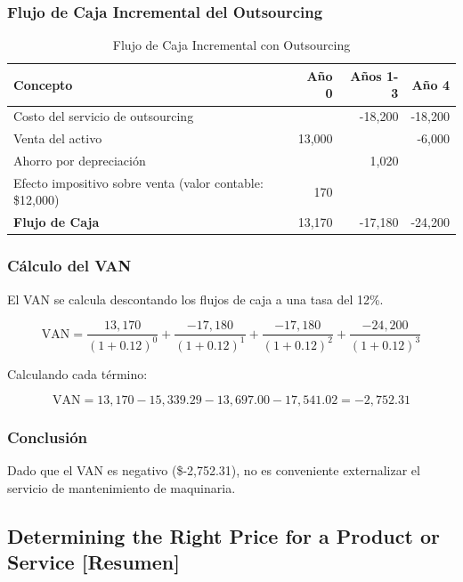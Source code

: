 \documentclass{templateNote}
\begin{document}
\subsubsection*{Flujo de Caja Incremental del Outsourcing}

\begin{table}[H]
    \centering
        \begin{tabular}{lrrr}
            \toprule
            \textbf{Concepto} & \textbf{Año 0} & \textbf{Años 1-3} & \textbf{Año 4} \\
            \midrule
            Costo del servicio de outsourcing &  & -18,200 & -18,200 \\
            Venta del activo & 13,000 &  & -6,000 \\
            Ahorro por depreciación &  & 1,020 &  \\
            Efecto impositivo sobre venta (valor contable: \$12,000) & 170 &  &  \\
            \midrule
            \textbf{Flujo de Caja} & 13,170 & -17,180 & -24,200 \\
            \bottomrule
        \end{tabular}
    \caption{Flujo de Caja Incremental con Outsourcing}
\end{table}

\subsubsection*{Cálculo del VAN}

El VAN se calcula descontando los flujos de caja a una tasa del 12\%.

\[
\text{VAN} = \frac{13,170}{(1 + 0.12)^0} + \frac{-17,180}{(1 + 0.12)^1} + \frac{-17,180}{(1 + 0.12)^2} + \frac{-24,200}{(1 + 0.12)^3}
\]

Calculando cada término:

\[
\text{VAN} = 13,170 - 15,339.29 - 13,697.00 - 17,541.02 = -2,752.31
\]

\subsubsection*{Conclusión}

Dado que el VAN es negativo (\$-2,752.31), no es conveniente externalizar el servicio de mantenimiento de maquinaria.

\subsection*{Determining the Right Price for a Product or Service [Resumen]}
\end{document}
